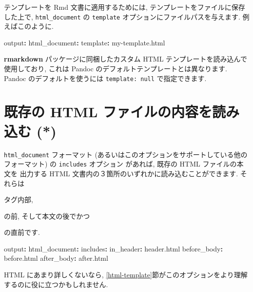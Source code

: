 \documentclass[
  11pt,
  lualatex,
  ja=standard]{bxjsreport}
\newenvironment{Shaded}{\begin{snugshade}}{\end{snugshade}}
\newcommand{\AttributeTok}[1]{\textcolor[rgb]{0.77,0.63,0.00}{#1}}
\newcommand{\FunctionTok}[1]{\textcolor[rgb]{0.00,0.00,0.00}{#1}}
\newcommand{\KeywordTok}[1]{\textcolor[rgb]{0.13,0.29,0.53}{\textbf{#1}}}
\begin{document}
テンプレートを Rmd 文書に適用するためには, テンプレートをファイルに保存した上で, \texttt{html\_document} の \texttt{template} オプションにファイルパスを与えます. 例えばこのように.

\begin{Shaded}
\begin{Highlighting}[]
\FunctionTok{output}\KeywordTok{:}
\AttributeTok{  }\FunctionTok{html\_document}\KeywordTok{:}
\AttributeTok{    }\FunctionTok{template}\KeywordTok{:}\AttributeTok{ my{-}template.html}
\end{Highlighting}
\end{Shaded}

\textbf{rmarkdown} パッケージに同梱したカスタム HTML テンプレートを読み込んで使用しており, これは Pandoc のデフォルトテンプレートとは異なります. Pandoc のデフォルトを使うには \texttt{template: null} で指定できます.

\hypertarget{include-html}{%
\section{既存の HTML ファイルの内容を読み込む (*)}\label{include-html}}

\texttt{html\_document} フォーマット (あるいはこのオプションをサポートしている他のフォーマット) の \texttt{includes} オプション があれば, 既存の HTML ファイルの本文を 出力する HTML 文書内の３箇所のいずれかに読み込むことができます. それらは

タグ内部,

の前, そして本文の後でかつ

の直前です.

\begin{Shaded}
\begin{Highlighting}[]
\FunctionTok{output}\KeywordTok{:}
\AttributeTok{  }\FunctionTok{html\_document}\KeywordTok{:}
\AttributeTok{    }\FunctionTok{includes}\KeywordTok{:}
\AttributeTok{      }\FunctionTok{in\_header}\KeywordTok{:}\AttributeTok{ header.html}
\AttributeTok{      }\FunctionTok{before\_body}\KeywordTok{:}\AttributeTok{ before.html}
\AttributeTok{      }\FunctionTok{after\_body}\KeywordTok{:}\AttributeTok{ after.html}
\end{Highlighting}
\end{Shaded}

HTML にあまり詳しくないなら, \ref{html-template}節がこのオプションをより理解するのに役に立つかもしれません.
\end{document}
